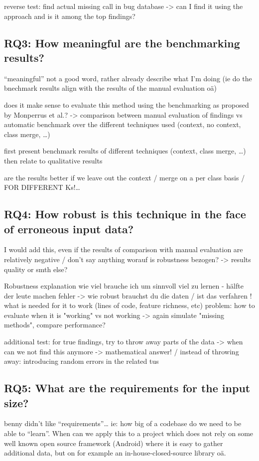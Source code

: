 reverse test: find actual missing call in bug database -> can I find it using the approach and is it among the top findings?

\subsection{RQ3: How meaningful are the benchmarking results?}
``meaningful'' not a good word, rather already describe what I'm doing (ie do the bnechmark results align with the results of the manual evaluation oä)

does it make sense to evaluate this method using the benchmarking as proposed by Monperrus et al.?
-> comparison between manual evaluation of findings vs automatic benchmark over the different techniques used (context, no context, class merge, \ldots)

first present benchmark results of different techniques (context, class merge, \ldots) then relate to qualitative results

are the results better if we leave out the context / merge on a per class basis / FOR DIFFERENT Ks!\ldots

\subsection{RQ4: How robust is this technique in the face of erroneous input data?}
I would add this, even if the results of comparison with manual evaluation are relatively negative / don't say anything
worauf is robustness bezogen? -> results quality or smth else?

Robustness explanation
    wie viel brauche ich um sinnvoll viel zu lernen - hälfte der leute machen fehler -> wie robust brauchst du die daten / ist das verfahren !
    what is needed for it to work (lines of code, feature richness, etc) 
    problem: how to evaluate when it is "working" vs not working -> again simulate "missing methods", compare performance?

additional test:
	for true findings, try to throw away parts of the data -> when can we not find this anymore -> mathematical answer!
    / instead of throwing away: introducing random errors in the related tus

\subsection{RQ5: What are the requirements for the input size?}
benny didn't like ``requirements''\ldots
ie: how big of a codebase do we need to be able to ``learn''. When can we apply this to a project which does not rely on some well known open source framework (Android) where it is easy to gather additional data, but on for example an in-house-closed-source library oä.

